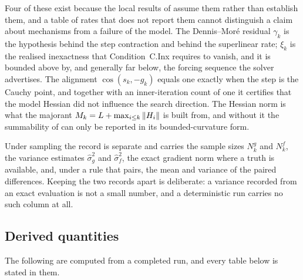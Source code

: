 \documentclass[11pt]{article}
\theoremstyle{plain}
\theoremstyle{definition}
\theoremstyle{remark}
\numberwithin{equation}{section}
\begin{document}
Four of these exist because the local results of \PartII{} assume them rather
than establish them, and a table of rates that does not report them cannot
distinguish a claim about mechanisms from a failure of the model. The
Dennis--Mor\'e residual $\gamma_k$ is the hypothesis behind the step contraction
and behind the superlinear rate; $\xi_k$ is the realised inexactness that
Condition~C.Inx requires to vanish, and it is bounded above by, and generally far
below, the forcing sequence the solver advertises. The alignment
$\cos(s_k,-g_k)$ equals one exactly when the step is the Cauchy point, and
together with an inner-iteration count of one it certifies that the model Hessian
did not influence the search direction. The Hessian norm is what the majorant
$M_k = L + \max_{i\leq k}\left \lVert H_i \right \rVert$ is built from, and without it the
summability of \PartII{} can only be reported in its bounded-curvature form.

Under sampling the record is separate and carries the sample sizes $N_k^g$ and
$N_k^f$, the variance estimates $\widehat\sigma_g^2$ and $\widehat\sigma_f^2$,
the exact gradient norm where a truth is available, and, under a rule that pairs,
the mean and variance of the paired differences. Keeping the two records apart is
deliberate: a variance recorded from an exact evaluation is not a small number,
and a deterministic run carries no such column at all.

\subsection{Derived quantities}
\label{sec: derived}

The following are computed from a completed run, and every table below is stated
in them.
\end{document}
